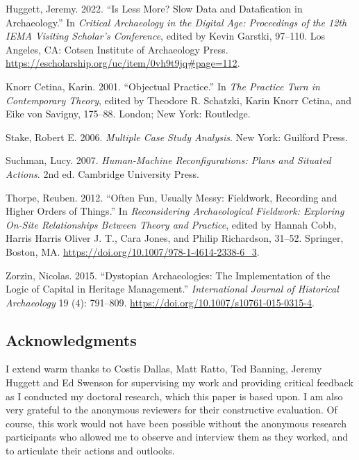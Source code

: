 \documentclass[
  canadian,
]{article}
\newlength{\cslhangindent}
\newenvironment{CSLReferences}[2] %
 {\begin{list}{}{%
  \setlength{\itemindent}{0pt}
  \setlength{\leftmargin}{0pt}
  \setlength{\parsep}{0pt}
  \ifodd #1
   \setlength{\leftmargin}{\cslhangindent}
   \setlength{\itemindent}{-1\cslhangindent}
  \fi
  \setlength{\itemsep}{#2\baselineskip}}}
 {\end{list}}
\begin{document}
\begin{CSLReferences}{1}{0}
Huggett, Jeremy. 2022. {``Is {Less More}? {Slow Data} and {Datafication}
in {Archaeology}.''} In \emph{Critical {Archaeology} in the {Digital
Age}: {Proceedings} of the 12th {IEMA Visiting Scholar}'s {Conference}},
edited by Kevin Garstki, 97--110. Los Angeles, CA: Cotsen Institute of
Archaeology Press.
\url{https://escholarship.org/uc/item/0vh9t9jq\#page=112}.

Knorr Cetina, Karin. 2001. {``Objectual Practice.''} In \emph{The
{Practice Turn} in {Contemporary Theory}}, edited by Theodore R.
Schatzki, Karin Knorr Cetina, and Eike von Savigny, 175--88. London; New
York: Routledge.

Stake, Robert E. 2006. \emph{Multiple Case Study Analysis}. New York:
Guilford Press.

Suchman, Lucy. 2007. \emph{Human-Machine Reconfigurations: Plans and
Situated Actions}. 2nd ed. Cambridge University Press.

Thorpe, Reuben. 2012. {``Often {Fun}, {Usually Messy}: {Fieldwork},
{Recording} and {Higher Orders} of {Things}.''} In \emph{Reconsidering
{Archaeological Fieldwork}: {Exploring On-Site Relationships Between
Theory} and {Practice}}, edited by Hannah Cobb, Harris Harris Oliver J.
T., Cara Jones, and Philip Richardson, 31--52. Springer, Boston, MA.
\url{https://doi.org/10.1007/978-1-4614-2338-6_3}.

Zorzin, Nicolas. 2015. {``Dystopian {Archaeologies}: {The
Implementation} of the {Logic} of {Capital} in {Heritage Management}.''}
\emph{International Journal of Historical Archaeology} 19 (4): 791--809.
\url{https://doi.org/10.1007/s10761-015-0315-4}.

\end{CSLReferences}

\subsection{Acknowledgments}\label{acknowledgments}

I extend warm thanks to Costis Dallas, Matt Ratto, Ted Banning, Jeremy
Huggett and Ed Swenson for supervising my work and providing critical
feedback as I conducted my doctoral research, which this paper is based
upon. I am also very grateful to the anonymous reviewers for their
constructive evaluation. Of course, this work would not have been
possible without the anonymous research participants who allowed me to
observe and interview them as they worked, and to articulate their
actions and outlooks.
\end{document}
